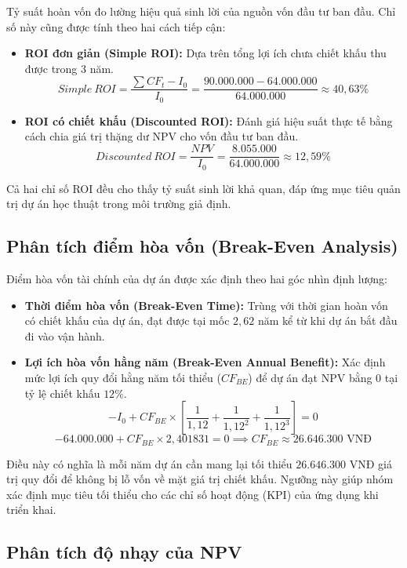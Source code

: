 Tỷ suất hoàn vốn đo lường hiệu quả sinh lời của nguồn vốn đầu tư ban đầu. Chỉ số này cũng được tính theo hai cách tiếp cận:

\begin{itemize}
  \item \textbf{ROI đơn giản (Simple ROI):}
  Dựa trên tổng lợi ích chưa chiết khấu thu được trong 3 năm.
  \[
  Simple\ ROI = \frac{\sum CF_t - I_0}{I_0} = \frac{90.000.000 - 64.000.000}{64.000.000} \approx 40{,}63\%
  \]
  
  \item \textbf{ROI có chiết khấu (Discounted ROI):}
  Đánh giá hiệu suất thực tế bằng cách chia giá trị thặng dư NPV cho vốn đầu tư ban đầu.
  \[
  Discounted\ ROI = \frac{NPV}{I_0} = \frac{8.055.000}{64.000.000} \approx 12{,}59\%
  \]
\end{itemize}

Cả hai chỉ số ROI đều cho thấy tỷ suất sinh lời khả quan, đáp ứng mục tiêu quản trị dự án học thuật trong môi trường giả định.

\subsection{Phân tích điểm hòa vốn (Break-Even Analysis)}

Điểm hòa vốn tài chính của dự án được xác định theo hai góc nhìn định lượng:

\begin{itemize}
  \item \textbf{Thời điểm hòa vốn (Break-Even Time):}
  Trùng với thời gian hoàn vốn có chiết khấu của dự án, đạt được tại mốc $2{,}62$ năm kể từ khi dự án bắt đầu đi vào vận hành.
  
  \item \textbf{Lợi ích hòa vốn hằng năm (Break-Even Annual Benefit):}
  Xác định mức lợi ích quy đổi hằng năm tối thiểu ($CF_{BE}$) để dự án đạt NPV bằng 0 tại tỷ lệ chiết khấu $12\%$.
  \[
  -I_0 + CF_{BE} \times \left[ \frac{1}{1{,}12} + \frac{1}{1{,}12^2} + \frac{1}{1{,}12^3} \right] = 0
  \]
  \[
  -64.000.000 + CF_{BE} \times 2{,}401831 = 0 \implies CF_{BE} \approx 26.646.300 \text{ VNĐ}
  \]
\end{itemize}

Điều này có nghĩa là mỗi năm dự án cần mang lại tối thiểu $26.646.300$ VNĐ giá trị quy đổi để không bị lỗ vốn về mặt giá trị chiết khấu. Ngưỡng này giúp nhóm xác định mục tiêu tối thiểu cho các chỉ số hoạt động (KPI) của ứng dụng khi triển khai.

\subsection{Phân tích độ nhạy của NPV}


